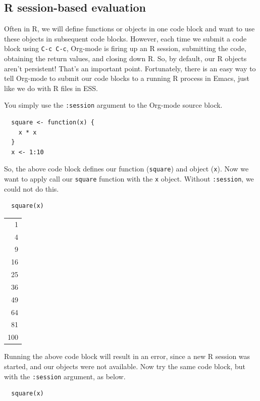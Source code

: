 \documentclass[11pt]{article}
\begin{document}
\subsection*{R session-based evaluation}
\label{sec-4-1}

Often in R, we will define functions or objects in one code block and want to use these objects in subsequent code blocks. However, each time we submit a code block using \texttt{C-c C-c}, Org-mode is firing up an R session, submitting the code, obtaining the return values, and closing down R. So, by default, our R objects aren't persistent! That's an important point. Fortunately, there is an easy way to tell Org-mode to submit our code blocks to a running R process in Emacs, just like we do with R files in ESS.

You simply use the \texttt{:session} argument to the Org-mode source block.   

\begin{verbatim}
  square <- function(x) {
    x * x
  }
  x <- 1:10
\end{verbatim}

So, the above code block defines our function (\texttt{square}) and object (\texttt{x}). Now we want to apply call our \texttt{square} function with the \texttt{x} object. Without \texttt{:session}, we could not do this.

\begin{verbatim}
  square(x)
\end{verbatim}

\begin{center}
\begin{tabular}{r}
1\\
4\\
9\\
16\\
25\\
36\\
49\\
64\\
81\\
100\\
\end{tabular}
\end{center}

Running the above code block will result in an error, since a new R session was started, and our objects were not available. Now try the same code block, but with the \texttt{:session} argument, as below. 

\begin{verbatim}
  square(x)
\end{verbatim}
\end{document}
